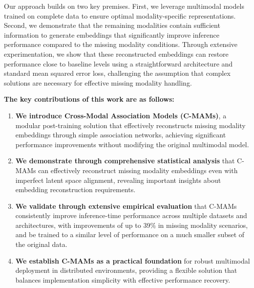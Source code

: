 Our approach builds on two key premises.
First,
we leverage multimodal models
trained on complete data
to ensure optimal modality-specific representations.
Second,
we demonstrate that the remaining modalities
contain sufficient information
to generate embeddings that significantly improve
inference performance compared to the missing modality conditions.
Through extensive experimentation,
we show that these reconstructed embeddings
can restore performance close to baseline levels
using a straightforward architecture
and standard mean squared error loss,
challenging the assumption that complex solutions
are necessary for effective missing modality handling.

\textbf{The key contributions of this work are as follows:}
\begin{enumerate}
	\item \textbf{We introduce Cross-Modal Association Models (C-MAMs)},
	a modular post-training solution that effectively reconstructs
	missing modality embeddings through simple association networks,
	achieving significant performance improvements
	without modifying the original multimodal model.
	\item \textbf{We demonstrate through comprehensive statistical analysis}
	that C-MAMs can effectively reconstruct missing modality embeddings
	even with imperfect latent space alignment,
	revealing important insights about embedding reconstruction requirements.
	\item \textbf{We validate through extensive empirical evaluation}
	that C-MAMs consistently improve inference-time performance
	across multiple datasets and architectures,
	with improvements of up to 39\% in missing modality scenarios, and be trained to a similar level of performance on a much smaller subset of the original data.
	\item \textbf{We establish C-MAMs as a practical foundation}
	for robust multimodal deployment in distributed environments,
	providing a flexible solution that balances
	implementation simplicity with effective performance recovery.
\end{enumerate}